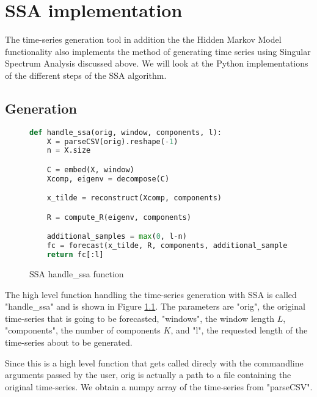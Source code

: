 
\chapter{SSA implementation}\label{chapter:ssa-impl}

The time-series generation tool in addition the the Hidden Markov Model functionality also implements the method of generating time series using Singular Spectrum Analysis discussed above. We will look at the Python implementations of the different steps of the SSA algorithm. 

\section{Generation}

\begin{figure}
\begin{singlespace}
\begin{lstlisting}[language=Python]
def handle_ssa(orig, window, components, l):
    X = parseCSV(orig).reshape(-1)
    n = X.size

    C = embed(X, window)
    Xcomp, eigenv = decompose(C)

    x_tilde = reconstruct(Xcomp, components)

    R = compute_R(eigenv, components)

    additional_samples = max(0, l-n)
    fc = forecast(x_tilde, R, components, additional_samples)
    return fc[:l]
\end{lstlisting}
\end{singlespace}
\caption{SSA handle\_ssa function}    
\label{fig:ssa-handle}
\end{figure}

The high level function handling the time-series generation with SSA is called "handle\_ssa" and is shown in Figure \ref{fig:ssa-handle}. The parameters are "orig", the original time-series that is going to be forecasted, "windows", the window length $L$, "components", the number of components $K$, and "l", the requested length of the time-series about to be generated. 

Since this is a high level function that gets called direcly with the commandline arguments passed by the user, orig is actually a path to a file containing the original time-series. We obtain a numpy array of the time-series from "parseCSV". 

